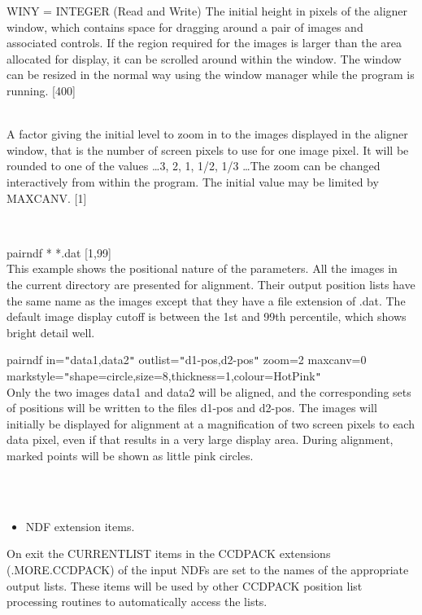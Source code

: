 \documentclass[twoside,11pt]{article}
\renewcommand{\_}{\texttt{\symbol{95}}}
\newcommand{\sstexamples}[1]{
   \item[Examples:] \mbox{} \\
   \vspace{-3.5ex}
   \begin{description}
      #1
   \end{description}
}
\newcommand{\sstsubsection}[1]{ \item[{#1}] \mbox{} \\}
\newcommand{\sstexamplesubsection}[2]{\sloppy \item{\ssttt #1} \mbox{} \\ #2 }
\newcommand{\sstnotes}[1]{\item[Notes:] \mbox{} \\[1.3ex] #1}
\newcommand{\sstitemlist}[1]{
  \mbox{} \\
  \vspace{-3.5ex}
  \begin{itemize}
     #1
  \end{itemize}
}
\newcommand{\sstitem}{\item}
\newcommand{\sstexamples}[1]{
      \item[Examples:] \\
      \begin{description}
         #1
      \end{description}
      \\
   }
\newcommand{\sstsubsection}[1]{\item[{#1}]}
\newcommand{\sstexamplesubsection}[2]{\item[{\ssttt #1}] #2}
\newcommand{\sstnotes}[1]{\item[Notes:] #1 }
\newcommand{\sstitemlist}[1]{
      \begin{itemize}
         #1
      \end{itemize}
      \\
   }
\newcommand{\sstitem}{\item}
\begin{document}
{{{         WINY = \_INTEGER (Read and Write)
      } {
         The initial height in pixels of the aligner window, which contains
         space for dragging around a pair of images and associated
         controls.  If the region required for the images is larger 
         than the area allocated for display, it can be scrolled 
         around within the window.  The window can be resized in the 
         normal way using the window manager while the program is running.
         [400]
      }
      \sstsubsection{
         ZOOM = \_DOUBLE (Read and Write)
      } {
         A factor giving the initial level to zoom in to the images
         displayed in the aligner window, that is the number of 
         screen pixels to use for one
         image pixel.  It will be rounded to one of the values
         \ldots 3, 2, 1, 1/2, 1/3 \ldots  The zoom can be changed
         interactively from within the program.  The initial value
         may be limited by MAXCANV.
         [1]
      }
   }
   \sstexamples{
      \sstexamplesubsection{
         pairndf * *.dat [1,99]
      } {
         This example shows the positional nature of the parameters.
         All the images in the current directory are presented for 
         alignment.  Their output position lists have the same name 
         as the images except that they have a file extension of .dat.
         The default image display cutoff is between the 1st and 99th
         percentile, which shows bright detail well.
      }
      \sstexamplesubsection{
         pairndf in={\tt "}data1,data2{\tt "} outlist={\tt "}d1-pos,d2-pos{\tt "} zoom=2 maxcanv=0 markstyle={\tt "}shape=circle,size=8,thickness=1,colour=HotPink{\tt "}
      } {
         Only the two images data1 and data2 will be aligned, and the 
         corresponding sets of positions will be written to the
         files d1-pos and d2-pos.  The images will initially be 
         displayed for alignment at a magnification of two screen 
         pixels to each data pixel, even if that results in a very 
         large display area.  During alignment, marked points will be
         shown as little pink circles.
      }
   }
   \sstnotes{

      \sstitemlist{

         \sstitem
         NDF extension items.

      }
        On exit the CURRENT\_LIST items in the CCDPACK extensions
        (.MORE.CCDPACK) of the input NDFs are set to the names of the
        appropriate output lists. These items will be used by other
        CCDPACK position list processing routines to automatically
        access the lists.

}}
\end{document}
